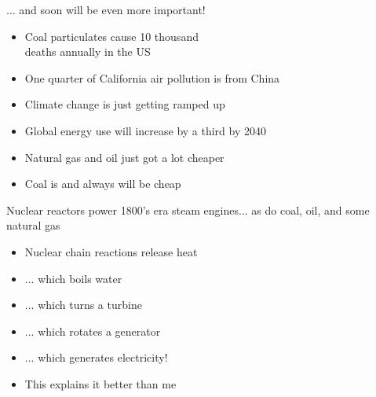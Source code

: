 \documentclass{beamer}
\begin{document}
        \begin{frame}{... and soon will be even more important!}

            \begin{itemize}

                \item Coal particulates cause 10 thousand \\ deaths annually in the US
                \pause
                \item One quarter of California air pollution is from China
                \pause
                \item Climate change is just getting ramped up
                \pause

                \vspace{2em}

                \item Global energy use will increase by a third by 2040
                \pause
                \item Natural gas and oil just got a lot cheaper
                \pause
                \item Coal is and always will be cheap

            \end{itemize}

        \end{frame}

        \begin{frame}{Nuclear reactors power 1800's era steam engines}{... as do coal, oil, and some natural gas}
            \begin{itemize}
                \item Nuclear chain reactions release heat
                \pause
                \item ... which boils water
                \pause
                \item ... which turns a turbine
                \pause
                \item ... which rotates a generator
                \pause
                \item ... which generates electricity!
                \pause
                \item This \href{https://www.youtube.com/v/VJfIbBDR3e8?start=0&end=165}{} explains it better than me
            \end{itemize}
        \end{frame}
\end{document}

